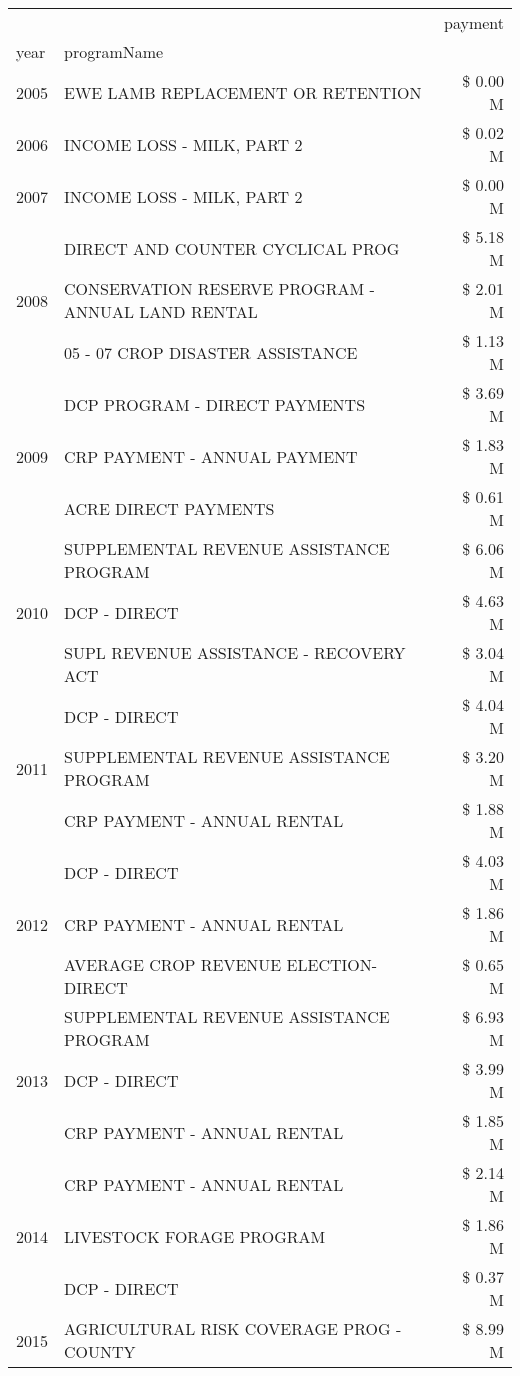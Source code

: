 \begin{tabular}{llr}
\toprule
 &  & payment \\
year & programName &  \\
\midrule
2005 & EWE LAMB REPLACEMENT OR RETENTION & \$ 0.00 M \\
\cline{1-3}
2006 & INCOME LOSS - MILK, PART 2 & \$ 0.02 M \\
\cline{1-3}
2007 & INCOME LOSS - MILK, PART 2 & \$ 0.00 M \\
\cline{1-3}
\multirow[t]{3}{*}{2008} & DIRECT AND COUNTER CYCLICAL PROG & \$ 5.18 M \\
 & CONSERVATION RESERVE PROGRAM - ANNUAL LAND RENTAL & \$ 2.01 M \\
 & 05 - 07 CROP DISASTER ASSISTANCE & \$ 1.13 M \\
\cline{1-3}
\multirow[t]{3}{*}{2009} & DCP PROGRAM - DIRECT PAYMENTS & \$ 3.69 M \\
 & CRP PAYMENT - ANNUAL PAYMENT & \$ 1.83 M \\
 & ACRE DIRECT PAYMENTS & \$ 0.61 M \\
\cline{1-3}
\multirow[t]{3}{*}{2010} & SUPPLEMENTAL REVENUE ASSISTANCE PROGRAM & \$ 6.06 M \\
 & DCP - DIRECT & \$ 4.63 M \\
 & SUPL REVENUE ASSISTANCE - RECOVERY ACT & \$ 3.04 M \\
\cline{1-3}
\multirow[t]{3}{*}{2011} & DCP - DIRECT & \$ 4.04 M \\
 & SUPPLEMENTAL REVENUE ASSISTANCE PROGRAM & \$ 3.20 M \\
 & CRP PAYMENT - ANNUAL RENTAL & \$ 1.88 M \\
\cline{1-3}
\multirow[t]{3}{*}{2012} & DCP - DIRECT & \$ 4.03 M \\
 & CRP PAYMENT - ANNUAL RENTAL & \$ 1.86 M \\
 & AVERAGE CROP REVENUE ELECTION-DIRECT & \$ 0.65 M \\
\cline{1-3}
\multirow[t]{3}{*}{2013} & SUPPLEMENTAL REVENUE ASSISTANCE PROGRAM & \$ 6.93 M \\
 & DCP - DIRECT & \$ 3.99 M \\
 & CRP PAYMENT - ANNUAL RENTAL & \$ 1.85 M \\
\cline{1-3}
\multirow[t]{3}{*}{2014} & CRP PAYMENT - ANNUAL RENTAL & \$ 2.14 M \\
 & LIVESTOCK FORAGE PROGRAM & \$ 1.86 M \\
 & DCP - DIRECT & \$ 0.37 M \\
\cline{1-3}
\multirow[t]{3}{*}{2015} & AGRICULTURAL RISK COVERAGE PROG - COUNTY & \$ 8.99 M \\

\end{tabular}
